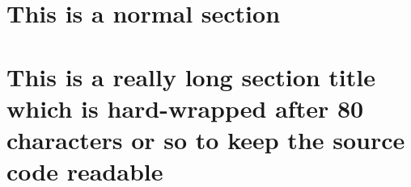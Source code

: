 \documentclass{article}
\begin{document}
\section{This is a normal section}

\section{
    This is a really long section title which is hard-wrapped
    after 80 characters or so to keep the source code readable
}
\end{document}

